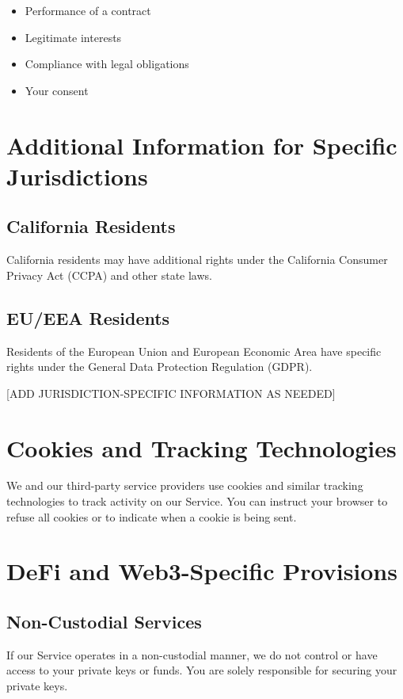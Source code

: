 \documentclass[12pt]{article}
\begin{document}
\begin{itemize}
    \item Performance of a contract
    \item Legitimate interests
    \item Compliance with legal obligations
    \item Your consent
\end{itemize}

\section{Additional Information for Specific Jurisdictions}

\subsection{California Residents}

California residents may have additional rights under the California Consumer Privacy Act (CCPA) and other state laws.

\subsection{EU/EEA Residents}

Residents of the European Union and European Economic Area have specific rights under the General Data Protection Regulation (GDPR).

    [ADD JURISDICTION-SPECIFIC INFORMATION AS NEEDED]

\section{Cookies and Tracking Technologies}

We and our third-party service providers use cookies and similar tracking technologies to track activity on our Service. You can instruct your browser to refuse all cookies or to indicate when a cookie is being sent.

\section{DeFi and Web3-Specific Provisions}

\subsection{Non-Custodial Services}
If our Service operates in a non-custodial manner, we do not control or have access to your private keys or funds. You are solely responsible for securing your private keys.
\end{document}
